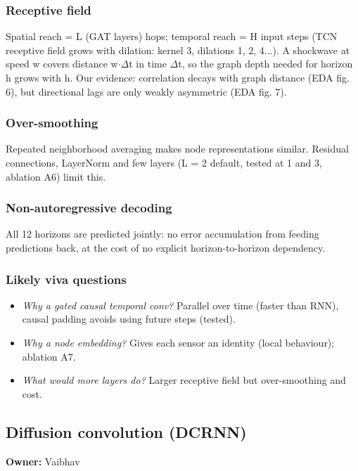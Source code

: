 \documentclass[10pt,a4paper]{article}
\begin{document}
\subsubsection*{Receptive field}
Spatial reach = L (GAT layers) hops; temporal reach = H input steps (TCN receptive field grows with dilation: kernel 3, dilations 1, 2, 4...). A shockwave at speed w covers distance w\ensuremath{\cdot}\ensuremath{\Delta}t in time \ensuremath{\Delta}t, so the graph depth needed for horizon h grows with h. Our evidence: correlation decays with graph distance (EDA fig. 6), but directional lags are only weakly asymmetric (EDA fig. 7).

\subsubsection*{Over-smoothing}
Repeated neighborhood averaging makes node representations similar. Residual connections, LayerNorm and few layers (L = 2 default, tested at 1 and 3, ablation A6) limit this.

\subsubsection*{Non-autoregressive decoding}
All 12 horizons are predicted jointly: no error accumulation from feeding predictions back, at the cost of no explicit horizon-to-horizon dependency.

\subsubsection*{Likely viva questions}
\begin{itemize}[nosep,leftmargin=*]
\item \emph{Why a gated causal temporal conv?} Parallel over time (faster than RNN), causal padding avoids using future steps (tested).
\item \emph{Why a node embedding?} Gives each sensor an identity (local behaviour); ablation A7.
\item \emph{What would more layers do?} Larger receptive field but over-smoothing and cost.
\end{itemize}

\subsection*{Diffusion convolution (DCRNN)}
\textbf{Owner:} Vaibhav
\end{document}
